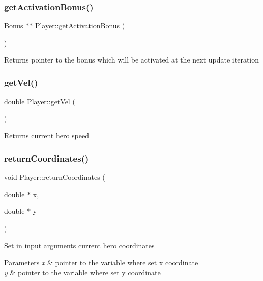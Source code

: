 \subsubsection{\texorpdfstring{get\+Activation\+Bonus()}{getActivationBonus()}}
{\footnotesize\ttfamily \hyperlink{class_bonus}{Bonus} $\ast$$\ast$ Player\+::get\+Activation\+Bonus (\begin{DoxyParamCaption}{ }\end{DoxyParamCaption})}

\begin{DoxyReturn}{Returns}
pointer to the bonus which will be activated at the next update iteration 
\end{DoxyReturn}
\mbox{\label{class_player_afbabae83ae2b21caf794efa91e26c37d}} 
\subsubsection{\texorpdfstring{get\+Vel()}{getVel()}}
{\footnotesize\ttfamily double Player\+::get\+Vel (\begin{DoxyParamCaption}{ }\end{DoxyParamCaption})}

\begin{DoxyReturn}{Returns}
current hero speed 
\end{DoxyReturn}
\mbox{\label{class_player_ab3d8dc6872a9903ea2717b57d77790a3}} 
\subsubsection{\texorpdfstring{return\+Coordinates()}{returnCoordinates()}}
{\footnotesize\ttfamily void Player\+::return\+Coordinates (\begin{DoxyParamCaption}\item[{double $\ast$}]{x,  }\item[{double $\ast$}]{y }\end{DoxyParamCaption})}

Set in input arguments current hero coordinates 
\begin{DoxyParams}{Parameters}
{\em x} & pointer to the variable where set x coordinate \\
\hline
{\em y} & pointer to the variable where set y coordinate \\
\hline
\end{DoxyParams}
\mbox{\label{class_player_aefa23e8642f25b0f7e72543599d567f6}} 
